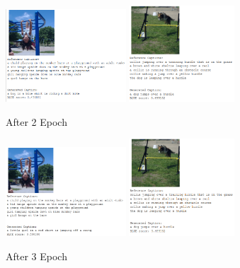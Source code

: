 \documentclass{article}
\begin{document}
    \begin{figure}[H]
        \centering
        \includegraphics[width=0.4\textwidth]{rnn_girl_epoch_2.PNG}
        \includegraphics[width=0.35\textwidth]{rnn_dog_epoch_2.PNG}
        \caption{After 2 Epoch}
    \end{figure}

    \begin{figure}[H]
        \centering
        \includegraphics[width=0.4\textwidth]{rnn_girl_epoch_3.PNG}
        \includegraphics[width=0.35\textwidth]{rnn_dog_epoch_3.PNG}
        \caption{After 3 Epoch}
    \end{figure}
\end{document}
